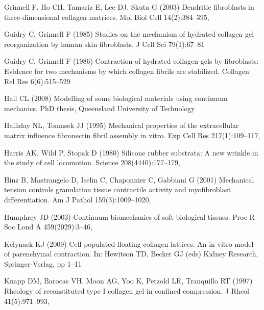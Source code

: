 \begin{thebibliography}{124}
Grinnell F, Ho CH, Tamariz E, Lee DJ, Skuta G (2003) Dendritic fibroblasts in
  three-dimensional collagen matrices. Mol Biol Cell 14(2):384--395,

Guidry C, Grinnell F (1985) Studies on the mechanism of hydrated collagen gel
  reorganization by human skin fibroblasts. J Cell Sci 79(1):67--81

Guidry C, Grinnell F (1986) Contraction of hydrated collagen gels by
  fibroblasts: Evidence for two mechanisms by which collagen fibrils are
  stabilized. Collagen Rel Res 6(6):515--529

Hall CL (2008) Modelling of some biological materials using continuum
  mechanics. PhD thesis, Queensland University of Technology

Halliday NL, Tomasek JJ (1995) Mechanical properties of the extracellular
  matrix influence fibronectin fibril assembly in vitro. Exp Cell Res
  217(1):109--117, 

Harris AK, Wild P, Stopak D (1980) Silicone rubber substrata: A new wrinkle in
  the study of cell locomotion. Science 208(4440):177--179,

Hinz B, Mastrangelo D, Iselin C, Chaponnier C, Gabbiani G (2001) Mechanical
  tension controls granulation tissue contractile activity and myofibroblast
  differentiation. Am J Pathol 159(3):1009--1020,

Humphrey JD (2003) Continuum biomechanics of soft biological tissues. Proc R
  Soc Lond A 459(2029):3--46, 

Kelynack KJ (2009) Cell-populated floating collagen lattices: An in vitro model
  of parenchymal contraction. In: Hewitson TD, Becker GJ (eds) Kidney Research,
  Springer-Verlag, pp 1--11

Knapp DM, Barocas VH, Moon AG, Yoo K, Petzold LR, Tranquillo RT (1997) Rheology
  of reconstituted type {I} collagen gel in confined compression. J Rheol
  41(5):971--993, 


\end{thebibliography}
